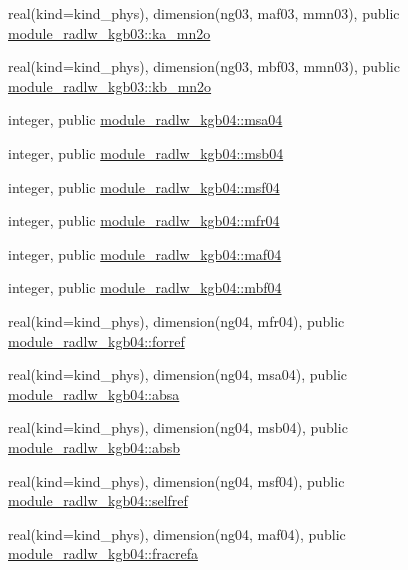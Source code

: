 \begin{DoxyCompactItemize}
real(kind=kind\+\_\+phys), dimension(ng03, maf03, mmn03), public \hyperlink{namespacemodule__radlw__kgb03_aeeba4e0a8fc97c557e1127b4d5d1bd94}{module\+\_\+radlw\+\_\+kgb03\+::ka\+\_\+mn2o}
\item 
real(kind=kind\+\_\+phys), dimension(ng03, mbf03, mmn03), public \hyperlink{namespacemodule__radlw__kgb03_aa2442e663e83b222648a86a34cd6631c}{module\+\_\+radlw\+\_\+kgb03\+::kb\+\_\+mn2o}
\item 
integer, public \hyperlink{namespacemodule__radlw__kgb04_ac8c5caff005fd04d01009dd9e977d570}{module\+\_\+radlw\+\_\+kgb04\+::msa04}
\item 
integer, public \hyperlink{namespacemodule__radlw__kgb04_ab9ce0111a156f7b80f2adaa9f3e84a32}{module\+\_\+radlw\+\_\+kgb04\+::msb04}
\item 
integer, public \hyperlink{namespacemodule__radlw__kgb04_a4b38dd1165aca80e19697df7ae74a27a}{module\+\_\+radlw\+\_\+kgb04\+::msf04}
\item 
integer, public \hyperlink{namespacemodule__radlw__kgb04_ab6ae25b4a793bf78ccd504685d639039}{module\+\_\+radlw\+\_\+kgb04\+::mfr04}
\item 
integer, public \hyperlink{namespacemodule__radlw__kgb04_a60ff35def4e526c7d9cf3ec88bdd4485}{module\+\_\+radlw\+\_\+kgb04\+::maf04}
\item 
integer, public \hyperlink{namespacemodule__radlw__kgb04_a768f4447809fb11206dce383a121d595}{module\+\_\+radlw\+\_\+kgb04\+::mbf04}
\item 
real(kind=kind\+\_\+phys), dimension(ng04, mfr04), public \hyperlink{namespacemodule__radlw__kgb04_a816fd065291a92c13d026d38a708479b}{module\+\_\+radlw\+\_\+kgb04\+::forref}
\item 
real(kind=kind\+\_\+phys), dimension(ng04, msa04), public \hyperlink{namespacemodule__radlw__kgb04_a8d73bb6971c872e15a24a81d3917167e}{module\+\_\+radlw\+\_\+kgb04\+::absa}
\item 
real(kind=kind\+\_\+phys), dimension(ng04, msb04), public \hyperlink{namespacemodule__radlw__kgb04_aaacc55911b42c67396b5cdc4318e0d5f}{module\+\_\+radlw\+\_\+kgb04\+::absb}
\item 
real(kind=kind\+\_\+phys), dimension(ng04, msf04), public \hyperlink{namespacemodule__radlw__kgb04_a696b91ef86ccbda17df10f770797cafa}{module\+\_\+radlw\+\_\+kgb04\+::selfref}
\item 
real(kind=kind\+\_\+phys), dimension(ng04, maf04), public \hyperlink{namespacemodule__radlw__kgb04_ace1d87742e2c543d9b0662e1c7d2b624}{module\+\_\+radlw\+\_\+kgb04\+::fracrefa}
\item 

\end{DoxyCompactItemize}
